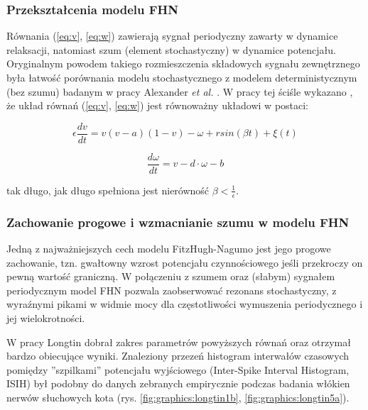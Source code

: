   

  \subsubsection{Przekształcenia modelu FHN}

  Równania (\ref{eq:v}, \ref{eq:w}) zawierają sygnał periodyczny zawarty w dynamice relaksacji, natomiast szum (element stochastyczny) w dynamice potencjału. Oryginalnym powodem takiego rozmieszczenia składowych sygnału zewnętrznego była łatwość porównania modelu stochastycznego z modelem deterministycznym (bez szumu) badanym w pracy Alexander \emph{et al.} \cite{alexander}. W pracy tej ściśle wykazano \cite{longtin}, że układ równań (\ref{eq:v}, \ref{eq:w}) jest równoważny układowi w postaci:

  \begin{equation}
    \epsilon \frac{dv}{dt} = v(v-a)(1-v)- \omega + r sin(\beta t) + \xi(t)
  \end{equation}

  \begin{equation}
    \frac{d \omega}{dt} = v - d \cdot \omega - b
  \end{equation}

  tak długo, jak długo spełniona jest nierówność $\beta < \frac{1}{\epsilon}$.

  \subsubsection{Zachowanie progowe i wzmacnianie szumu w modelu FHN}

  Jedną z najważniejszych cech modelu FitzHugh-Nagumo jest jego progowe zachowanie, tzn. gwałtowny wzrost potencjału czynnościowego jeśli przekroczy on pewną wartość graniczną. W połączeniu z szumem oraz (słabym) sygnałem periodycznym model FHN pozwala zaobserwować rezonans stochastyczny, z wyraźnymi pikami w widmie mocy dla częstotliwości wymuszenia periodycznego i jej wielokrotności.


  W pracy \cite{longtin} Longtin dobrał zakres parametrów powyższych równań oraz otrzymał bardzo obiecujące wyniki. Znaleziony przezeń histogram interwałów czasowych pomiędzy ''szpilkami'' potencjału wyjściowego (Inter-Spike Interval Histogram, ISIH) był podobny do danych zebranych empirycznie podczas badania włókien nerwów słuchowych kota (rys. \ref{fig:graphics:longtin1b}, \ref{fig:graphics:longtin5a}).

